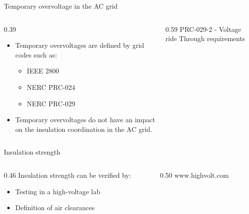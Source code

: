 \begin{frame}{Temporary overvoltage in the AC grid}
  \begin{columns}[c,onlytextwidth]
    \begin{column}{0.39\textwidth}
      \begin{itemize}
        \setlength{\itemsep}{0.5em}
        \item Temporary overvoltages are defined by grid codes such as:
        \begin{itemize}
          \item IEEE 2800
          \item NERC PRC-024
          \item NERC PRC-029
        \end{itemize}
        \item Temporary overvoltages do not have an impact on the insulation coordination in the AC grid.
      \end{itemize}
      \vspace{0.3em}
    \end{column}
    \begin{column}{0.59\textwidth}
      \centering
      {\color{atGray}\footnotesize PRC-029-2 - Voltage ride Through requirements}
    \end{column}
  \end{columns}
\end{frame}

\begin{frame}{Insulation strength}
  \begin{columns}[c,onlytextwidth]
    \begin{column}{0.46\textwidth}
      Insulation strength can be verified by:
      \begin{itemize}
        \setlength{\itemsep}{0.4em}
        \item Testing in a high-voltage lab
        \item Definition of air clearances
      \end{itemize}
    \end{column}
    \begin{column}{0.50\textwidth}
      \centering
      \vspace{0.3em}
      {\color{atGray}\footnotesize www.highvolt.com}      
    \end{column}
  \end{columns}
\end{frame}

